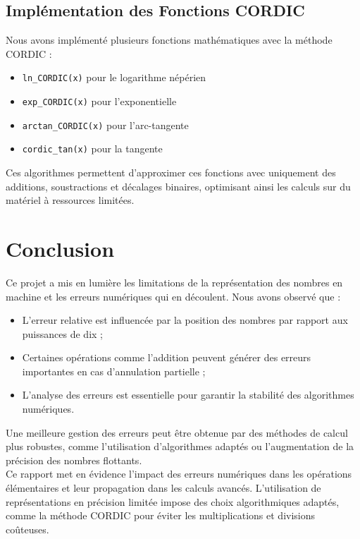 \documentclass{article}
\begin{document}
\subsection{Implémentation des Fonctions CORDIC}
Nous avons implémenté plusieurs fonctions mathématiques avec la méthode CORDIC :
\begin{itemize}
    \item \texttt{ln\_CORDIC(x)} pour le logarithme népérien
    \item \texttt{exp\_CORDIC(x)} pour l'exponentielle
    \item \texttt{arctan\_CORDIC(x)} pour l'arc-tangente
    \item \texttt{cordic\_tan(x)} pour la tangente

\end{itemize}

Ces algorithmes permettent d'approximer ces fonctions avec uniquement des additions, soustractions et décalages binaires, optimisant ainsi les calculs sur du matériel à ressources limitées.

\section{Conclusion}

Ce projet a mis en lumière les limitations de la représentation des nombres en machine et les erreurs numériques qui en découlent. Nous avons observé que :
\begin{itemize}
    \item L'erreur relative est influencée par la position des nombres par rapport aux puissances de dix ;
    \item Certaines opérations comme l'addition peuvent générer des erreurs importantes en cas d'annulation partielle ;
    \item L'analyse des erreurs est essentielle pour garantir la stabilité des algorithmes numériques.

\end{itemize}
Une meilleure gestion des erreurs peut être obtenue par des méthodes de calcul plus robustes, comme l'utilisation d'algorithmes adaptés ou l'augmentation de la précision des nombres flottants.\\
\indent Ce rapport met en évidence l'impact des erreurs numériques dans les opérations élémentaires et leur propagation dans les calculs avancés. L'utilisation de représentations en précision limitée impose des choix algorithmiques adaptés, comme la méthode CORDIC pour éviter les multiplications et divisions coûteuses. 
\end{document}
